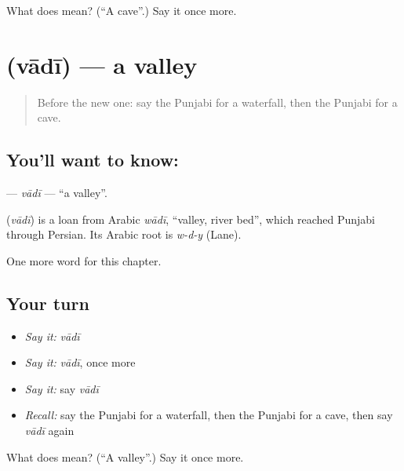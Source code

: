 \begin{tcolorbox}[breakable,colback=teal!4,colframe=teal!35!black,title={Before you move on}]
What does  mean? (\textquotedblleft{}A cave\textquotedblright{}.) Say it once more.
\end{tcolorbox}
\section[\texorpdfstring{\pa{ਵਾਦੀ} (vādī)}{ਵਾਦੀ (vādī)}]{ (vādī) — a valley}

\label{lesson:PA-C127-vadi}



\begin{quote}
Before the new one: say the Punjabi for a waterfall, then the Punjabi for a cave.
\end{quote}

\subsection*{You'll want to know: }
\textbf{} — \emph{vādī} — \textquotedblleft{}a valley\textquotedblright{}.

\begin{cousinweb}
\textbf{} (\emph{vādī}) is a loan from Arabic \emph{wādī}, \textquotedblleft{}valley, river bed\textquotedblright{}, which reached Punjabi through Persian. Its Arabic root is \emph{w-d-y} (Lane).
\end{cousinweb}

\begin{grammarlens}[title={What you've built}]
One more word for this chapter.
\end{grammarlens}

\subsection*{Your turn}
\begin{itemize}
\raggedright
  \item \emph{Say it:} \emph{vādī}
  \item \emph{Say it:} \emph{vādī}, once more
  \item \emph{Say it:} say \emph{vādī}
  \item \emph{Recall:} say the Punjabi for a waterfall, then the Punjabi for a cave, then say \emph{vādī} again
\end{itemize}

\begin{tcolorbox}[breakable,colback=teal!4,colframe=teal!35!black,title={Before you move on}]
What does  mean? (\textquotedblleft{}A valley\textquotedblright{}.) Say it once more.
\end{tcolorbox}

